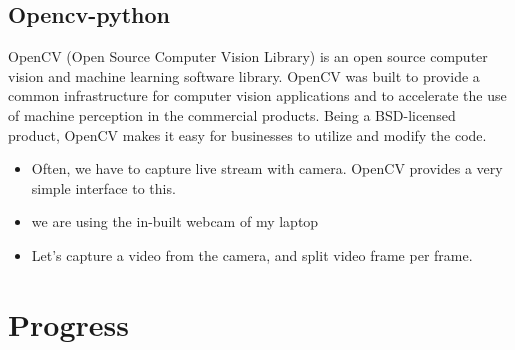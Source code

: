 \documentclass[a4paper]{article}
\begin{document}

\subsection{Opencv-python}
OpenCV (Open Source Computer Vision Library) is an open source computer vision and machine learning software library. OpenCV was built to provide a common infrastructure for computer vision applications and to accelerate the use of machine perception in the commercial products. Being a BSD-licensed product, OpenCV makes it easy for businesses to utilize and modify the code.

\begin{itemize}
    \item Often, we have to capture live stream with camera. OpenCV provides a very simple interface to this. 
    \item we are using the in-built webcam of my laptop
    \item Let’s capture a video from the camera, and split video frame per frame. 
\end{itemize}



\section{Progress}
\end{document}
